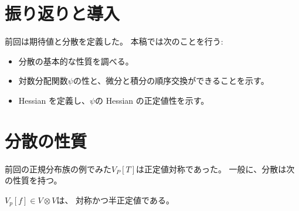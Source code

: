 \documentclass[report]{jlreq}
\begin{document}
%

%
\section{振り返りと導入}

前回は期待値と分散を定義した。
本稿では次のことを行う:
\begin{itemize}
    \item 分散の基本的な性質を調べる。
    \item 対数分配関数$\psi$の\smooth 性と、微分と積分の順序交換ができることを示す。
    \item Hessian を定義し、$\psi$の Hessian の正定値性を示す。
\end{itemize}

%
\section{分散の性質}

前回の正規分布族の例でみた$V_P[T]$は正定値対称であった。
一般に、分散は次の性質を持つ。

\begin{theorem}[分散の半正定値対称性]
    $V_p[f] \in V \otimes V$は、
    対称かつ半正定値である。
\end{theorem}
\end{document}
